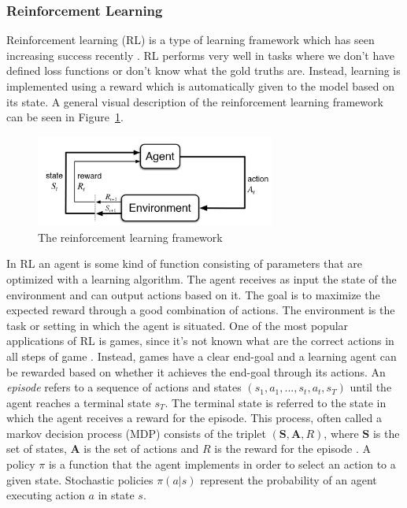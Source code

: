 \documentclass[12pt]{article}
\begin{document}
\subsubsection{Reinforcement Learning} \label{sssec:RL}
Reinforcement learning (RL) \cite{Sutton:1998} is a type of learning framework which has seen increasing success recently \cite{Mnih:2013,Mnih:2015,Silver:2016}. RL performs very well in tasks where we don't have defined loss functions or don't know what the gold truths are. Instead, learning is implemented using a reward which is automatically given to the model based on its state. A general visual description of the reinforcement learning framework can be seen in Figure~\ref{fig:RL}.

\begin{figure}[H]
	\centering
	\includegraphics[width=0.7\textwidth]{pics/RL.png}
	\caption{The reinforcement learning framework \cite{Sutton:1998}}
	\label{fig:RL}
\end{figure}

In RL an agent is some kind of function consisting of parameters that are optimized with a learning algorithm. The agent receives as input the state of the environment and can output actions based on it. The goal is to maximize the expected reward through a good combination of actions. The environment is the task or setting in which the agent is situated. One of the most popular applications of RL is games, since it's not known what are the correct actions in all steps of game \cite{Mnih:2013}. Instead, games have a clear end-goal and a learning agent can be rewarded based on whether it achieves the end-goal through its actions. An \textit{episode} refers to a sequence of actions and states \((s_1,a_1,...,s_t,a_t,s_T)\) until the agent reaches a terminal state \(s_T\). The terminal state is referred to the state in which the agent receives a reward for the episode. This process, often called a markov decision process (MDP) consists of the triplet \((\bm{S},\bm{A},R)\), where \(\bm{S}\) is the set of states, \(\bm{A}\) is the set of actions and \(R\) is the reward for the episode \cite{Kandasamy:2017}. A policy \(\pi\) is a function that the agent implements in order to select an action to a given state. Stochastic policies \(\pi(a|s)\) represent the probability of an agent executing action \(a\) in state \(s\).
\end{document}
